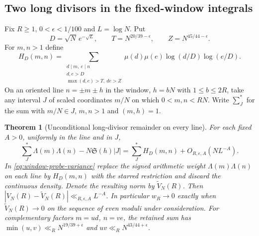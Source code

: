 \documentclass[11pt,a4paper]{article}
\numberwithin{equation}{section}
\newtheorem{theorem}{Theorem}[section]
\newcommand{\SSS}{\mathfrak S}
\begin{document}
\subsection{Two long divisors in the fixed-window integrals}

Fix $R\ge1$, $0<\epsilon<1/100$ and $L=\log N$. Put
\[
 D=\sqrt N\,e^{-\sqrt L},\qquad T=N^{20/39-\epsilon},
 \qquad Z=N^{45/44-\epsilon}.
\]
For $m,n>1$ define
\[
 H_D(m,n)=
 \sum_{\substack{d\mid m,\ e\mid n\\ d,e>D\\
                  \max(d,e)>T,\ de>Z}}
       \mu(d)\mu(e)\log(d/D)\log(e/D).
\]
On an oriented line $n=\pm m\pm h$ in the window, $h=bN$ with
$1\le b\le2R$, take any interval $J$ of scaled coordinates
$m/N$ on which $0<m,n<RN$. Write $\sum_J^*$ for the sum with $m/N\in J$,
$m,n>1$ and $(m,h)=1$.

\begin{theorem}[Unconditional long-divisor remainder on every line]
\label{thm:window-long-divisors}
For each fixed $A>0$, uniformly in the line and in $J$,
\begin{equation}
 \sum_J^*\Lambda(m)\Lambda(n)-N\SSS(h)|J|
       =\sum_J^* H_D(m,n)+O_{R,\epsilon,A}(NL^{-A}).
 \label{eq:window-long-divisors}
\end{equation}
In \cref{eq:window-probe-variance} replace the signed arithmetic
weight $\Lambda(m)\Lambda(n)$ on each line by $H_D(m,n)$ with the
starred restriction and discard the continuous density. Denote the
resulting norm by $\widetilde V_N(R)$. Then
$|V_N(R)-\widetilde V_N(R)|\ll_{R,\epsilon,A}L^{-A}$.
In particular $w_R\to0$ exactly when $\widetilde V_N(R)\to0$ on
the sequence of even moduli under consideration. For complementary
factors $m=ud$, $n=ve$, the retained sum has
$\min(u,v)\ll_R N^{19/39+\epsilon}$ and $uv\ll_R N^{43/44+\epsilon}$.
\end{theorem}
\end{document}
